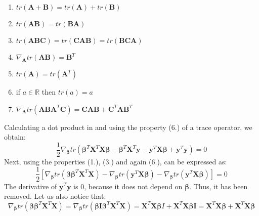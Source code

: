 \begin{appendices}
\begin{enumerate}
    \item $tr(\boldsymbol{A}+\boldsymbol{B}) = tr(\boldsymbol{A})+tr(\boldsymbol{B})$
    \item $tr(\boldsymbol{AB}) = tr(\boldsymbol{BA})$
    \item $tr(\boldsymbol{ABC}) = tr(\boldsymbol{CAB}) = tr(\boldsymbol{BCA})$
    \item $\nabla_{\boldsymbol{A}}tr(\boldsymbol{AB}) = \boldsymbol{B}^T$
    \item $tr(\boldsymbol{A})=tr(\boldsymbol{A}^T)$
    \item if $a \in \mathbb{R}$ then $tr(a)=a$
    \item $\nabla_{\boldsymbol{A}}tr(\boldsymbol{ABA}^T\boldsymbol{C}) = \boldsymbol{CAB}+\boldsymbol{C}^T\boldsymbol{AB}^T$
\end{enumerate}
Calculating a dot product in  and using the property (6.) of a trace operator, we obtain:
\begin{equation}\label{eq:least2}
    \frac{1}{2} \nabla_{\boldsymbol{\beta}} tr(\boldsymbol{\beta}^T\boldsymbol{X}^T\boldsymbol{X}\boldsymbol{\beta}-\boldsymbol{\beta}^T\boldsymbol{X}^T\boldsymbol{y}-\boldsymbol{y}^T\boldsymbol{X}\boldsymbol{\beta}+\boldsymbol{y}^T\boldsymbol{y}) = 0
\end{equation}
Next, using the properties (1.), (3.) and again (6.),  can be expressed as:
\begin{equation}\label{eq:least3}
    \frac{1}{2}[\nabla_{\boldsymbol{\beta}}tr(\boldsymbol{\beta}\boldsymbol{\beta}^T\boldsymbol{X}^T\boldsymbol{X})-\nabla_{\boldsymbol{\beta}}tr(\boldsymbol{y}^T\boldsymbol{X}\boldsymbol{\beta})-\nabla_{\boldsymbol{\beta}}tr(\boldsymbol{y}^T\boldsymbol{X}\boldsymbol{\beta})] = 0
\end{equation}
The derivative of $\boldsymbol{y}^T\boldsymbol{y}$ is $0$, because it does not depend on $\boldsymbol{\beta}$. Thus, it has been removed. Let us also notice that:
\begin{equation}\label{eq:least4}
    \nabla_{\boldsymbol{\beta}}tr(\boldsymbol{\beta}\boldsymbol{\beta}^T\boldsymbol{X}^T\boldsymbol{X}) = \nabla_{\boldsymbol{\beta}}tr(\boldsymbol{\beta}\boldsymbol{I}\boldsymbol{\beta}^T\boldsymbol{X}^T\boldsymbol{X}) = \boldsymbol{X}^T\boldsymbol{X}\boldsymbol{\beta}I + \boldsymbol{X}^T\boldsymbol{X}\boldsymbol{\beta}\boldsymbol{I} = \boldsymbol{X}^T\boldsymbol{X}\boldsymbol{\beta}+\boldsymbol{X}^T\boldsymbol{X}\boldsymbol{\beta}
\end{equation}

\end{appendices}
